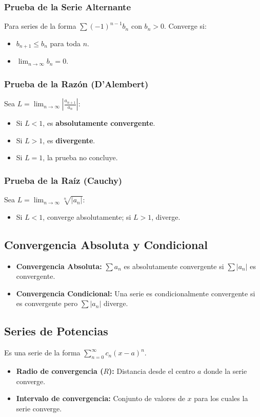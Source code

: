 \documentclass[a4paper,12pt]{article}
\begin{document}
\subsubsection{Prueba de la Serie Alternante}
Para series de la forma $\sum (-1)^{n-1} b_n$ con $b_n > 0$. Converge si:
\begin{itemize}
    \item $b_{n+1} \leq b_n$ para toda $n$.
    \item $\lim_{n \to \infty} b_n = 0$.
\end{itemize}

\subsubsection{Prueba de la Razón (D'Alembert)}
Sea $L = \lim_{n \to \infty} | \frac{a_{n+1}}{a_n} |$:
\begin{itemize}
    \item Si $L < 1$, es \textbf{absolutamente convergente}.
    \item Si $L > 1$, es \textbf{divergente}.
    \item Si $L = 1$, la prueba no concluye.
\end{itemize}

\subsubsection{Prueba de la Raíz (Cauchy)}
Sea $L = \lim_{n \to \infty} \sqrt[n]{|a_n|}$:
\begin{itemize}
    \item Si $L < 1$, converge absolutamente; si $L > 1$, diverge.
\end{itemize}

\subsection{Convergencia Absoluta y Condicional}
\begin{itemize}
    \item \textbf{Convergencia Absoluta:} $\sum a_n$ es absolutamente convergente si $\sum |a_n|$ es convergente.
    \item \textbf{Convergencia Condicional:} Una serie es condicionalmente convergente si es convergente pero $\sum |a_n|$ diverge.
\end{itemize}

\subsection{Series de Potencias}
Es una serie de la forma $\sum_{n=0}^{\infty} c_n (x - a)^n$.
\begin{itemize}
    \item \textbf{Radio de convergencia ($R$):} Distancia desde el centro $a$ donde la serie converge.
    \item \textbf{Intervalo de convergencia:} Conjunto de valores de $x$ para los cuales la serie converge.
\end{itemize}
\end{document}
